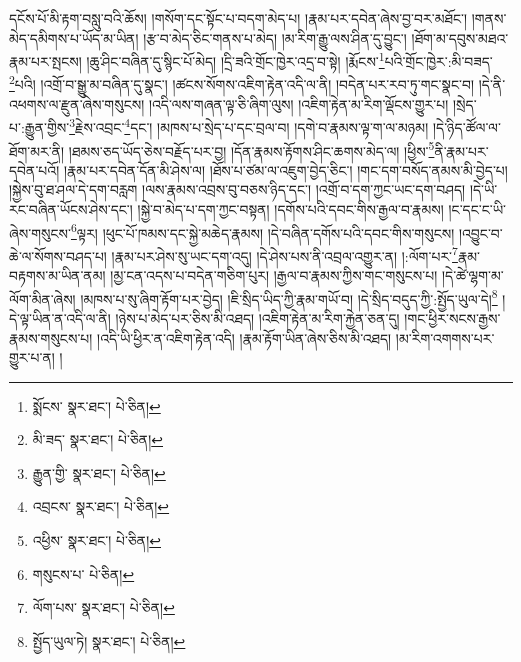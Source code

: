 དངོས་པོ་མི་རྟག་བསླུ་བའི་ཆོས། །གསོག་དང་སྟོང་པ་བདག་མེད་པ། །རྣམ་པར་དབེན་ཞེས་བྱ་བར་མཐོང་། །གནས་མེད་དམིགས་པ་ཡོད་མ་ཡིན། །རྩ་བ་མེད་ཅིང་གནས་པ་མེད། །མ་རིག་རྒྱུ་ལས་ཤིན་དུ་བྱུང་། །ཐོག་མ་དབུས་མཐའ་རྣམ་པར་སྤངས། །ཆུ་ཤིང་བཞིན་དུ་སྙིང་པོ་མེད། །དྲི་ཟའི་གྲོང་ཁྱེར་འདྲ་བ་སྟེ། །རྨོངས་\footnote{སྨོངས་  སྣར་ཐང་།  པེ་ཅིན། }པའི་གྲོང་ཁྱེར་:མི་བཟད་\footnote{མི་ཟད་  སྣར་ཐང་།  པེ་ཅིན། }པའི། །འགྲོ་བ་སྒྱུ་མ་བཞིན་དུ་སྣང་། །ཚངས་སོགས་འཇིག་རྟེན་འདི་ལ་ནི། །བདེན་པར་རབ་ཏུ་གང་སྣང་བ། །དེ་ནི་འཕགས་ལ་རྫུན་ཞེས་གསུངས། །འདི་ལས་གཞན་ལྟ་ཅི་ཞིག་ལུས། །འཇིག་རྟེན་མ་རིག་ལྡོངས་གྱུར་པ། །སྲེད་པ་:རྒྱུན་གྱིས་\footnote{རྒྱུན་གྱི་  སྣར་ཐང་།  པེ་ཅིན། }རྗེས་འབྲང་\footnote{འབྲངས་  སྣར་ཐང་།  པེ་ཅིན། }དང་། །མཁས་པ་སྲེད་པ་དང་བྲལ་བ། །དགེ་བ་རྣམས་ལྟ་ག་ལ་མཉམ། །དེ་ཉིད་ཚོལ་ལ་ཐོག་མར་ནི། །ཐམས་ཅད་ཡོད་ཅེས་བརྗོད་པར་བྱ། །དོན་རྣམས་རྟོགས་ཤིང་ཆགས་མེད་ལ། །ཕྱིས་\footnote{འཕྱིས་  སྣར་ཐང་།  པེ་ཅིན། }ནི་རྣམ་པར་དབེན་པའོ། །རྣམ་པར་དབེན་དོན་མི་ཤེས་ལ། །ཐོས་པ་ཙམ་ལ་འཇུག་བྱེད་ཅིང་། །གང་དག་བསོད་ནམས་མི་བྱེད་པ། །སྐྱེས་བུ་ཐ་ཤལ་དེ་དག་བརླག །ལས་རྣམས་འབྲས་བུ་བཅས་ཉིད་དང་། །འགྲོ་བ་དག་ཀྱང་ཡང་དག་བཤད། །དེ་ཡི་རང་བཞིན་ཡོངས་ཤེས་དང་། །སྐྱེ་བ་མེད་པ་དག་ཀྱང་བསྟན། །དགོས་པའི་དབང་གིས་རྒྱལ་བ་རྣམས། །ང་དང་ང་ཡི་ཞེས་གསུངས་\footnote{གསུངས་པ་  པེ་ཅིན། }ལྟར། །ཕུང་པོ་ཁམས་དང་སྐྱེ་མཆེད་རྣམས། །དེ་བཞིན་དགོས་པའི་དབང་གིས་གསུངས། །འབྱུང་བ་ཆེ་ལ་སོགས་བཤད་པ། །རྣམ་པར་ཤེས་སུ་ཡང་དག་འདུ། །དེ་ཤེས་པས་ནི་འབྲལ་འགྱུར་ན། །:ལོག་པར་\footnote{ལོག་པས་  སྣར་ཐང་།  པེ་ཅིན། }རྣམ་བརྟགས་མ་ཡིན་ནམ། །མྱ་ངན་འདས་པ་བདེན་གཅིག་པུར། །རྒྱལ་བ་རྣམས་ཀྱིས་གང་གསུངས་པ། །དེ་ཚེ་ལྷག་མ་ལོག་མིན་ཞེས། །མཁས་པ་སུ་ཞིག་རྟོག་པར་བྱེད། །ཇི་སྲིད་ཡིད་ཀྱི་རྣམ་གཡོ་བ། །དེ་སྲིད་བདུད་ཀྱི་:སྤྱོད་ཡུལ་དེ།\footnote{སྤྱོད་ཡུལ་ཏེ།  སྣར་ཐང་།  པེ་ཅིན། } །དེ་ལྟ་ཡིན་ན་འདི་ལ་ནི། །ཉེས་པ་མེད་པར་ཅིས་མི་འཐད། །འཇིག་རྟེན་མ་རིག་རྐྱེན་ཅན་དུ། །གང་ཕྱིར་སངས་རྒྱས་རྣམས་གསུངས་པ། །འདི་ཡི་ཕྱིར་ན་འཇིག་རྟེན་འདི། །རྣམ་རྟོག་ཡིན་ཞེས་ཅིས་མི་འཐད། །མ་རིག་འགགས་པར་གྱུར་པ་ན། །
